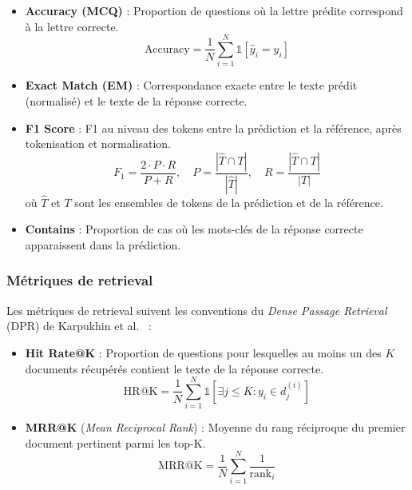 \documentclass[12pt,a4paper]{article}
\begin{document}
\begin{itemize}[leftmargin=*]
  \item \textbf{Accuracy (MCQ)} : Proportion de questions où la lettre prédite correspond à la lettre correcte.
  \begin{equation}
    \text{Accuracy} = \frac{1}{N} \sum_{i=1}^{N} \mathbb{1}[\hat{y}_i = y_i]
  \end{equation}

  \item \textbf{Exact Match (EM)} : Correspondance exacte entre le texte prédit (normalisé) et le texte de la réponse correcte.

  \item \textbf{F1 Score} : F1 au niveau des tokens entre la prédiction et la référence, après tokenisation et normalisation.
  \begin{equation}
    F_1 = \frac{2 \cdot P \cdot R}{P + R}, \quad P = \frac{|\hat{T} \cap T|}{|\hat{T}|}, \quad R = \frac{|\hat{T} \cap T|}{|T|}
  \end{equation}
  où $\hat{T}$ et $T$ sont les ensembles de tokens de la prédiction et de la référence.

  \item \textbf{Contains} : Proportion de cas où les mots-clés de la réponse correcte apparaissent dans la prédiction.
\end{itemize}

\subsubsection{Métriques de retrieval}

Les métriques de retrieval suivent les conventions du \textit{Dense Passage Retrieval} (DPR) de Karpukhin et al.~\cite{karpukhin2020dense} :

\begin{itemize}[leftmargin=*]
  \item \textbf{Hit Rate@K} : Proportion de questions pour lesquelles au moins un des $K$ documents récupérés contient le texte de la réponse correcte.
  \begin{equation}
    \text{HR@K} = \frac{1}{N} \sum_{i=1}^{N} \mathbb{1}\left[\exists j \leq K : y_i \in d_j^{(i)}\right]
  \end{equation}

  \item \textbf{MRR@K} (\textit{Mean Reciprocal Rank}) : Moyenne du rang réciproque du premier document pertinent parmi les top-K.
  \begin{equation}
    \text{MRR@K} = \frac{1}{N} \sum_{i=1}^{N} \frac{1}{\text{rank}_i}
  \end{equation}
\end{itemize}
\end{document}
